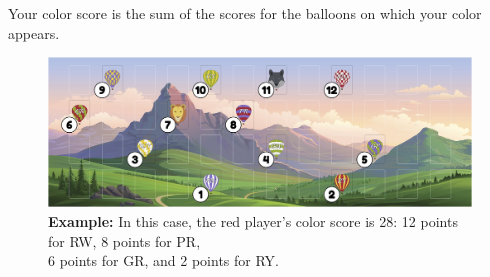 \documentclass[a6paper, 11pt, parskip=half, DIV=15]{scrartcl}
\begin{document}

Your color score is the sum of the scores for the balloons on which your color appears.

\vfill

\begin{figure}[hb]
\centering
\includegraphics[scale=0.115]{scoring_diagram.jpg}
\caption*{\textbf{Example:} In this case, the red player's color score is 28: 12 points for {\setmainfont{Playball}RW}, 8 points for {\setmainfont{Playball}PR},\\6 points for {\setmainfont{Playball}GR}, and 2 points for {\setmainfont{Playball}RY}.}
\end{figure}

\newpage
\enlargethispage{1.75\baselineskip}
\end{document}
